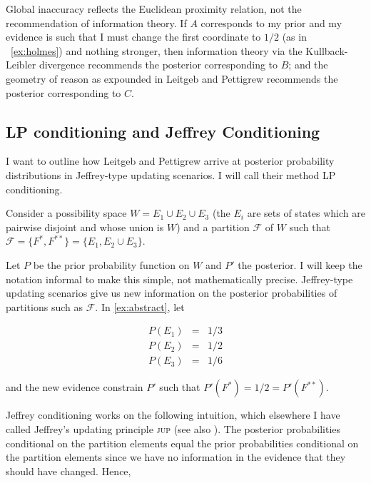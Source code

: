 \documentclass[smallextended]{svjour3}       %
\begin{document}
Global inaccuracy reflects the Euclidean proximity relation, not the
re\-commendation of information theory. If $A$ corresponds to my prior
and my evidence is such that I must change the first coordinate to
$1/2$ (as in {\xample}~\ref{ex:holmes}) and nothing stronger, then
information theory via the Kullback-Leibler divergence re\-commends
the posterior corresponding to $B$; and the geometry of reason as
expounded in Leitgeb and Pettigrew recommends the posterior
corresponding to $C$. 

\subsection{LP conditioning and Jeffrey Conditioning}
\label{subsec:meexughi}

I want to outline how Leitgeb and Pettigrew arrive at posterior
probability distributions in Jeffrey-type updating scenarios. I will
call their method LP conditioning.

\begin{quotex}
  \label{ex:abstract} Consider a possibility
  space $W=E_{1}\cup{}E_{2}\cup{}E_{3}$ (the $E_{i}$ are sets of
  states which are pairwise disjoint and whose union is $W$) and a
  partition $\mathcal{F}$ of $W$ such that
  $\mathcal{F}=\{F^{*},F^{**}\}=\{E_{1},E_{2}\cup{}E_{3}\}$.
\end{quotex}

Let $P$ be the prior probability function on $W$ and $P'$ the
posterior. I will keep the notation informal to make this simple, not
mathematically precise. Jeffrey-type updating scenarios give us new
information on the posterior probabilities of partitions such as
$\mathcal{F}$. In {\xample} \ref{ex:abstract}, let

\begin{equation}
  \label{eq:priors}
  \begin{array}{rcl}
    P(E_{1})&=&1/3 \\
    P(E_{2})&=&1/2 \\
    P(E_{3})&=&1/6
  \end{array}
\end{equation}

and the new evidence constrain $P'$ such that
$P'(F^{*})=1/2=P'(F^{**})$.

Jeffrey conditioning works on the following intuition, which elsewhere
I have called Jeffrey's updating principle \textsc{jup} (see also
). The posterior probabilities conditional on the
partition elements equal the prior probabilities conditional on the
partition elements since we have no information in the evidence that
they should have changed. Hence,
\end{document}
